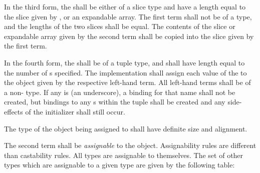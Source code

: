 \specsubsubitem
In the third form, the  shall be either of a slice
type and have a length equal to the slice given by ,
or an expandable array. The first term shall not be of a  type,
and the lengths of the two slices shall be equal. The contents of the slice or
expandable array given by the second term shall be copied into the slice given
by the first term.

\specsubsubitem
In the fourth form, the  shall be of a tuple type, and
shall have length equal to the number of s specified.
The implementation shall assign each value of the 
to the object given by the respective left-hand term. All left-hand terms shall
be of a non- type. If any 
is \terminal{\_} (an underscore), a binding for that name shall not be created,
but bindings to any s within the tuple shall be created
and any side-effects of the initializer shall still occur.

\specsubsubitem
The type of the object being assigned to shall have definite size and alignment.

\specsubsubitem
The second term shall be \textit{assignable} to the object. Assignability rules
are different than castability rules. All types are assignable to themselves.
The set of other types which are assignable to a given type are given by the
following table:

